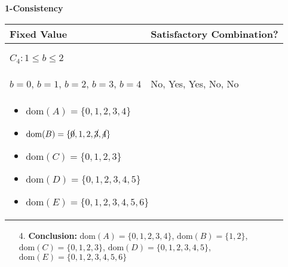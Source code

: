 \begin{example} \textbf{1-Consistency}
    \begin{center}
        \begin{tabular}{ll}
            \textbf{Fixed Value} & \textbf{Satisfactory Combination?} \\
            \toprule
            \multicolumn{2}{p{\linewidth}}{
            \begin{center}
                $C_4: 1 \leq b \leq 2$
            \end{center}} \\
            \midrule
                $b = 0$, $b=1$, $b=2$, $b=3$, $b=4$ & No, Yes, Yes, No, No \\
            \multicolumn{2}{p{\linewidth}}{
            \begin{itemize}
                \item $\text{dom}(A) = \{0, 1, 2, 3, 4\}$
                \item $\text{dom}(B) = \{\cancel{0}, 1, 2, \cancel{3}, \cancel{4}\} $
                \item $\text{dom}(C) = \{0, 1, 2, 3\} $
                \item $\text{dom}(D) = \{0, 1, 2, 3, 4, 5\} $
                \item $\text{dom}(E) = \{0, 1, 2, 3, 4, 5, 6\} $
            \end{itemize}} \\
            \bottomrule
        \end{tabular}
    \end{center}
    \vspace{1em}

    \begin{enumerate}
        \item[4. ] \textbf{Conclusion:} $\text{dom}(A) = \{0, 1, 2, 3, 4\}$, $\text{dom}(B) = \{1, 2\} $, $\text{dom}(C) = \{0, 1, 2, 3\} $, $\text{dom}(D) = \{0, 1, 2, 3, 4, 5\} $, $\text{dom}(E) = \{0, 1, 2, 3, 4, 5, 6\} $
    \end{enumerate}
\end{example}
